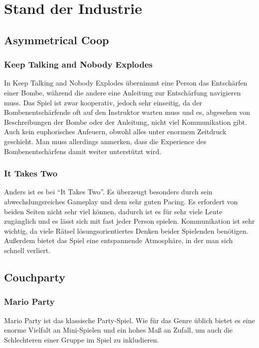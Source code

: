 \chapter{Stand der Industrie\label{_industrie}}

\section{Asymmetrical Coop}

\subsection{Keep Talking and Nobody Explodes}
In Keep Talking and Nobody Explodes übernimmt eine Person das Entschärfen einer Bombe, während die andere eine Anleitung zur Entschärfung navigieren muss. Das Spiel ist zwar kooperativ, jedoch sehr einseitig, da der Bombenentschärfende oft auf den Instruktor warten muss und es, abgesehen von Beschreibungen der Bombe oder der Anleitung, nicht viel Kommunikation gibt. Auch kein euphorisches Anfeuern, obwohl alles unter enormem Zeitdruck geschieht. Man muss allerdings anmerken, dass die Experience des Bombenentschärfens damit weiter unterstützt wird.

\subsection{It Takes Two}
Anders ist es bei "`It Takes Two"'. Es überzeugt besonders durch sein abwechslungsreiches Gameplay und dem sehr guten Pacing. Es erfordert von beiden Seiten nicht sehr viel können, dadurch ist es für sehr viele Leute zugänglich und es lässt sich mit fast jeder Person spielen. Kommunikation ist sehr wichtig, da viele Rätsel lösungsorientiertes Denken beider Spielenden benötigen. Außerdem bietet das Spiel eine entspannende Atmosphäre, in der man sich schnell verliert.

\section{Couchparty}

\subsection{Mario Party}
Mario Party ist das klassische Party-Spiel. Wie für das Genre üblich bietet es eine enorme Vielfalt an Mini-Spielen und ein hohes Maß an Zufall, um auch die Schlechteren einer Gruppe im Spiel zu inkludieren.

